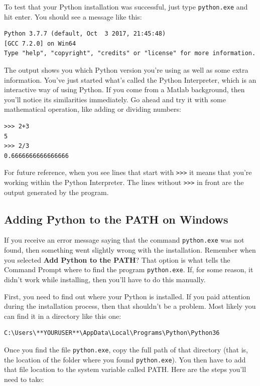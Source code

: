 To test that your Python installation was successful, just type \texttt{python.exe} and hit enter. You should see a message like this:

\begin{verbatim}
Python 3.7.7 (default, Oct  3 2017, 21:45:48)
[GCC 7.2.0] on Win64
Type "help", "copyright", "credits" or "license" for more information.
\end{verbatim}

The output shows you which Python version you're using as well as some extra information. You've just started what's called the Python Interpreter, which is an interactive way of using Python. If you come from a Matlab background, then you'll notice its similarities immediately. Go ahead and try it with some mathematical operation, like adding or dividing numbers:

\begin{verbatim}
>>> 2+3
5
>>> 2/3
0.6666666666666666
\end{verbatim}

For future reference, when you see lines that start with \texttt{>>>} it means that you're working within the Python Interpreter. The lines without \texttt{>>>} in front are the output generated by the program.

\subsection{Adding Python to the PATH on Windows}\label{subsec:path-windows}
If you receive an error message saying that the command \texttt{python.exe} was not found, then something went slightly wrong with the installation. Remember when you selected \textbf{Add Python to the PATH}? That option is what tells the Command Prompt where to find the program \texttt{python.exe}. If, for some reason, it didn't work while installing, then you'll have to do this manually.

First, you need to find out where your Python is installed. If you paid attention during the installation process, then that shouldn't be a problem. Most likely you can find it in a directory like this one:

\begin{verbatim}
C:\Users\**YOURUSER**\AppData\Local\Programs\Python\Python36
\end{verbatim}

Once you find the file \texttt{python.exe}, copy the full path of that directory (that is, the location of the folder where you found \texttt{python.exe}). You then have to add that file location to the system variable called PATH. Here are the steps you'll need to take:

